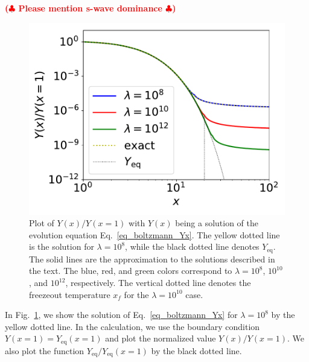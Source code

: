 \documentclass[12pt,twoside,book]{article}
\def\rem#1{ {\bf\textcolor{red}{($\clubsuit$ #1 $\clubsuit$)}}}
\begin{document}
\rem{Please mention s-wave dominance}

\begin{figure}[t]
 \centering \includegraphics[width=0.5\hsize]{figure/DMrelic.pdf}
 \caption{Plot of $Y(x) / Y(x=1)$ with $Y(x)$ being a solution of the
 evolution equation Eq.~\eqref{eq_boltzmann_Yx}.  The yellow dotted
 line is the solution for $\lambda = 10^{8}$, while the black dotted
 line denotes $Y_{\mathrm{eq}}$.  The solid lines are the
 approximation to the solutions described in the text.  The blue, red,
 and green colors correspond to $\lambda = 10^8$, $10^{10}$, and
 $10^{12}$, respectively.  The vertical dotted line denotes the
 freezeout temperature $x_f$ for the $\lambda = 10^{10}$ case.} \label{fig_DM_relic}
\end{figure}
In Fig.~\ref{fig_DM_relic}, we show the solution of
Eq.~\eqref{eq_boltzmann_Yx} for $\lambda = 10^8$ by the yellow dotted
line.  In the calculation, we use the boundary condition $Y(x=1) =
Y_{\mathrm{eq}} (x=1)$ and plot the normalized value $Y(x) / Y(x=1)$.
We also plot the function $Y_{\mathrm{eq}} / Y_{\mathrm{eq}} (x=1)$ by
the black dotted line.
\end{document}
